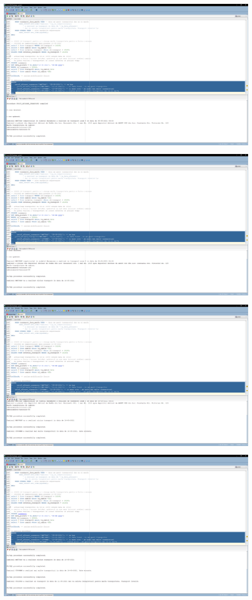\documentclass[12pt, a4paper]{article}
\begin{document}
\includegraphics[width=\textwidth]{9_1.png}

\includegraphics[width=\textwidth]{9_2.png}

\includegraphics[width=\textwidth]{9_3.png}

\includegraphics[width=\textwidth]{9_4.png}
\end{document}
